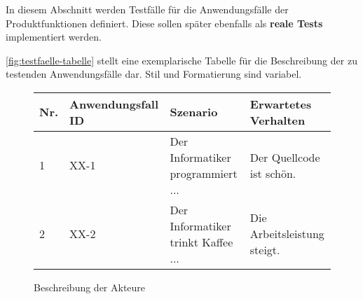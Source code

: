 \begin{tcolorbox}
In diesem Abschnitt werden Testfälle für die Anwendungsfälle der Produktfunktionen definiert.
Diese sollen später ebenfalls als \textbf{reale Tests} implementiert werden.

\autoref{fig:testfaelle-tabelle} stellt eine exemplarische Tabelle für die Beschreibung der zu testenden Anwendungsfälle dar. 
Stil und Formatierung sind variabel.
\end{tcolorbox}

\begin{figure}[!h]
	\begin{center}
		\begin{tabularx}{\textwidth}{ p{} | p{} | p{} | X }
			\textbf{Nr.} & \textbf{Anwendungsfall ID} & \textbf{Szenario} & \textbf{Erwartetes Verhalten} \\ \hline
			1 & XX-1 & Der Informatiker programmiert ... & Der Quellcode ist schön.\\ \hline
			2 & XX-2 & Der Informatiker trinkt Kaffee ... & Die Arbeitsleistung steigt.
		\end{tabularx}	
	\end{center}
	\caption{Beschreibung der Akteure}
	\label{fig:testfaelle-tabelle}
\end{figure}